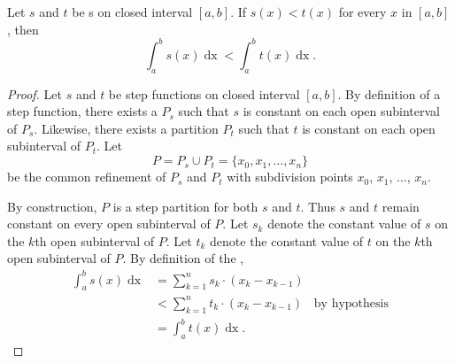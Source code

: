 \documentclass{report}
\begin{document}
\section{}%
\label{sec:step-comparison-theorem}
\label{sec:theorem-1.5}

\begin{theorem}{1.5}

  Let $s$ and $t$ be s on closed interval
    $[a, b]$.
  If $s(x) < t(x)$ for every $x$ in $[a, b]$, then
    $$\int_a^b s(x) \mathop{dx} < \int_a^b t(x) \mathop{dx}.$$

\end{theorem}

\begin{proof}

  Let $s$ and $t$ be step functions on closed interval $[a, b]$.
  By definition of a step function, there exists a 
    $P_s$ such that $s$ is constant on each open subinterval of $P_s$.
  Likewise, there exists a partition $P_t$ such that $t$ is constant on each
    open subinterval of $P_t$.
  Let $$P = P_s \cup P_t = \{x_0, x_1, \ldots, x_n\}$$ be the common refinement
    of $P_s$ and $P_t$ with subdivision points $x_0$, $x_1$, $\ldots$, $x_n$.

  By construction, $P$ is a step partition for both $s$ and $t$.
  Thus $s$ and $t$ remain constant on every open subinterval of $P$.
  Let $s_k$ denote the constant value of $s$ on the $k$th open subinterval of
    $P$.
  Let $t_k$ denote the constant value of $t$ on the $k$th open subinterval of
    $P$.
  By definition of the ,
    \begin{align*}
      \int_a^b s(x) \mathop{dx}
        & = \sum_{k=1}^n s_k \cdot (x_k - x_{k-1}) \\
        & < \sum_{k=1}^n t_k \cdot (x_k - x_{k-1}) & \text{by hypothesis} \\
        & = \int_a^b t(x) \mathop{dx}.
    \end{align*}

\end{proof}

\section{}%
\label{sec:step-additivity-with-respect-interval-integration}
\label{sec:theorem-1.6}
\end{document}
